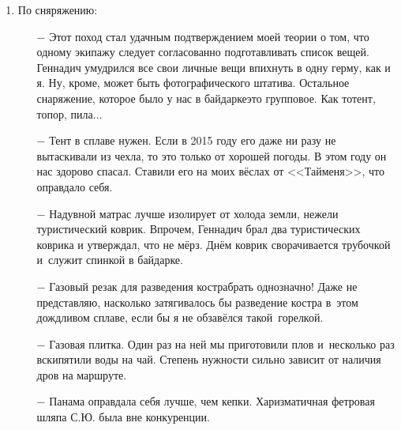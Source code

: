 \begin{enumerate}
\begin{enumerate}
	\end{enumerate}	
\item По сняряжению:
	\begin{enumerate}
		\item[$-$] Этот поход стал удачным подтверждением моей теории о том, что одному экипажу следует согласованно подготавливать список вещей. Геннадич умудрился все свои личные вещи впихнуть в одну герму, как и я. Ну, кроме, может быть фотографического штатива. Остальное снаряжение, которое было у нас в байдарке\mdash это групповое. Как то\mdash тент, топор, пила$\ldots$
		\item[$-$] Тент в сплаве нужен. Если в 2015 году его даже ни разу не вытаскивали из чехла, то это только от хорошей погоды. В этом году он нас здорово спасал. Ставили его на моих вёслах от <<Тайменя>>, что оправдало себя.
		\item[$-$] Надувной матрас лучше изолирует от холода земли, нежели туристический коврик. Впрочем, Геннадич брал два туристических коврика и утверждал, что не мёрз. Днём коврик сворачивается трубочкой и~служит спинкой в байдарке.
		\item[$-$] Газовый резак для разведения костра\mdash брать однозначно! Даже не представляю, насколько затягивалось бы разведение костра в~этом дождливом сплаве, если бы я не обзавёлся такой~горелкой.
		\item[$-$] Газовая плитка. Один раз на ней мы приготовили плов и~несколько раз вскипятили воды на чай. Степень нужности сильно зависит от наличия дров на маршруте.
		\item[$-$] Панама оправдала себя лучше, чем кепки. Харизматичная фетровая шляпа С.Ю. была вне конкуренции.

\end{enumerate}
\end{enumerate}
